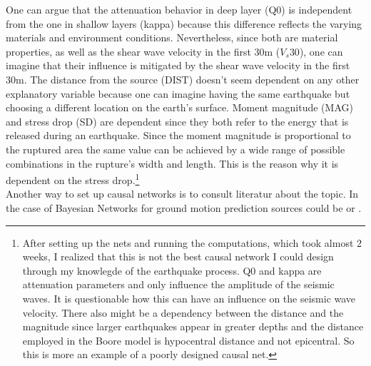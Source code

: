 One can argue that the attenuation behavior in deep layer (Q0) is independent from the one in shallow layers (kappa) because this difference reflects the varying materials and environment conditions. Nevertheless, since both are material properties, as well as the shear wave velocity in the first 30m ($V_s30$), one can imagine that their influence is mitigated by the shear wave velocity in the first 30m. The distance from the source (DIST) doesn't seem dependent on any other explanatory variable because one can imagine having the same earthquake but choosing a different location on the earth's surface. Moment magnitude (MAG) and stress drop (SD) are dependent since they both refer to the energy that is released during an earthquake. Since the moment magnitude is proportional to the ruptured area the same value can be achieved by a wide range of possible combinations in the rupture's width and length. This is the reason why it is dependent on the stress drop.\footnote{After setting up the nets and running the computations, which took almost 2 weeks, I realized that this is not the best causal network I could design through my knowlegde of the earthquake process. Q0 and kappa are attenuation parameters and only influence the amplitude of the seismic waves. It is questionable how this can have an influence on the seismic wave velocity. There also might be a dependency between the distance and the magnitude since larger earthquakes appear in greater depths and the distance employed in the Boore model is hypocentral distance and not epicentral. So this is more an example of a poorly designed causal net.}\\
Another way to set up causal networks is to consult literatur about the topic. In the case of Bayesian Networks for ground motion prediction sources could be \cite{kuehn2010} or \cite{Vogel2014}.\\

